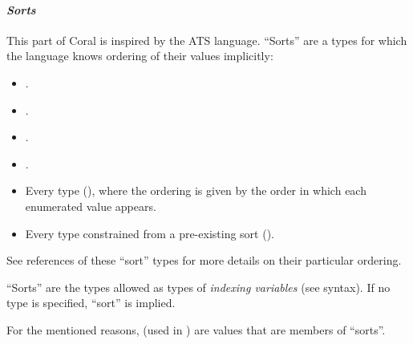 \paragraph{\em Sorts}
This part of Coral is inspired by the ATS language. ``Sorts'' are a types for which the language knows ordering of their values implicitly:
\begin{itemize}
\item {}.
\item {}.
\item {}.
\item {}.
\item Every  type (), where the ordering is given by the order in which each enumerated value appears. 
\item Every type constrained from a pre-existing sort ().
\end{itemize}

See references of these ``sort'' types for more details on their particular ordering. 

``Sorts'' are the types allowed as types of {\em indexing variables} (see  syntax). If no type is specified,  ``sort'' is implied. 

For the mentioned reasons,  (used in ) are values that are members of ``sorts''. 

